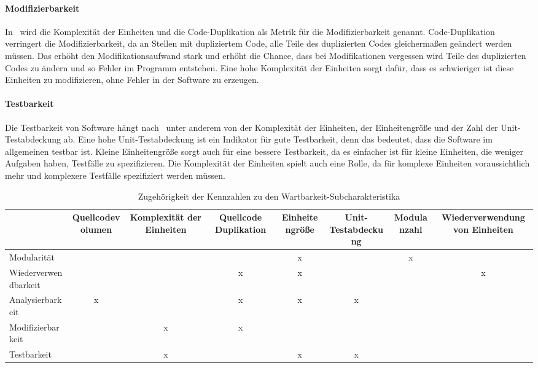 \documentclass[12pt, a4paper, ngerman]{article}
\begin{document}
\paragraph{Modifizierbarkeit}

In~\cite{maintainability_metrics} wird die Komplexität der Einheiten und die Code-Duplikation
als Metrik für die Modifizierbarkeit genannt.
Code-Duplikation verringert die Modifizierbarkeit, da an Stellen mit dupliziertem Code,
alle Teile des duplizierten Codes gleichermaßen geändert werden müssen.
Das erhöht den Modifikationsaufwand stark und erhöht die Chance,
dass bei Modifikationen vergessen wird Teile des duplizierten Codes zu ändern und so Fehler im Programm entstehen.
Eine hohe Komplexität der Einheiten sorgt dafür,
dass es schwieriger ist diese Einheiten zu modifizieren, ohne Fehler in der Software zu erzeugen.

\paragraph{Testbarkeit}

Die Testbarkeit von Software hängt nach~\cite{maintainability_metrics} unter anderem von der Komplexität der Einheiten,
der Einheitengröße und der Zahl der Unit-Testabdeckung ab.
Eine hohe Unit-Testabdeckung ist ein Indikator für gute Testbarkeit,
denn das bedeutet, dass die Software im allgemeinen testbar ist.
Kleine Einheitengröße sorgt auch für eine bessere Testbarkeit,
da es einfacher ist für kleine Einheiten, die weniger Aufgaben haben, Testfälle zu spezifizieren.
Die Komplexität der Einheiten spielt auch eine Rolle,
da für komplexe Einheiten voraussichtlich mehr und komplexere Testfälle spezifiziert werden müssen.

\begin{center}
  \begin{table}
    \centering
    \renewcommand{\arraystretch}{1.2}
    \begin{NiceTabular}{|l|c|c|c|c|c|c|c|}
      \hline
      & \rotate Quellcodevolumen
      & \rotate Komplexität der Einheiten
      & \rotate Quellcode Duplikation
      & \rotate Einheitengröße
      & \rotate Unit-Testabdeckung
      & \rotate Modulanzahl
      & \rotate Wiederverwendung von Einheiten \\\hline
      Modularität           & & & &x& &x& \\\hline
      Wiederverwendbarkeit  & & &x&x& & &x\\\hline
      Analysierbarkeit      &x& &x&x&x& & \\\hline
      Modifizierbarkeit     & &x&x& & & & \\\hline
      Testbarkeit           & &x& &x&x& & \\\hline
    \end{NiceTabular}
    \caption{Zugehörigkeit der Kennzahlen zu den Wartbarkeit-Subcharakteristika}
    \label{table:maintainability_metrics}
  \end{table}
\end{center}
\end{document}
